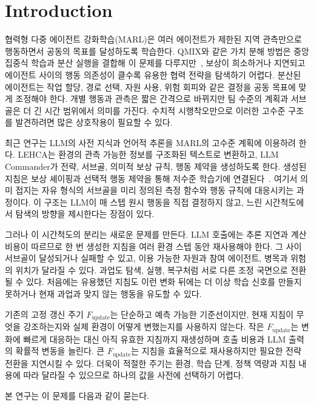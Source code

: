 \section{Introduction}

협력형 다중 에이전트 강화학습(MARL)은 여러 에이전트가 제한된 지역 관측만으로
행동하면서 공동의 목표를 달성하도록 학습한다. QMIX와 같은 가치 분해 방법은
중앙집중식 학습과 분산 실행을 결합해 이 문제를 다루지만~\cite{rashid2018qmix},
보상이 희소하거나 지연되고 에이전트 사이의 행동 의존성이 클수록 유용한 협력 전략을
탐색하기 어렵다. 분산된 에이전트는 작업 할당, 경로 선택, 자원 사용, 위험 회피와
같은 결정을 공동 목표에 맞게 조정해야 한다. 개별 행동과 관측은 짧은 간격으로
바뀌지만 팀 수준의 계획과 서브골은 더 긴 시간 범위에서 의미를 가진다. 수치적
시행착오만으로 이러한 고수준 구조를 발견하려면 많은 상호작용이 필요할 수 있다.

최근 연구는 LLM의 사전 지식과 언어적 추론을 MARL의 고수준 계획에 이용하려 한다.
LEHCA는 환경의 관측 가능한 정보를 구조화된 텍스트로 변환하고, LLM Commander가
전략, 서브골, 의미적 보상 규칙, 행동 제약을 생성하도록 한다. 생성된 지침은 보상
셰이핑과 선택적 행동 제약을 통해 저수준 학습기에 연결된다~\cite{bai2026lehca}.
여기서 의미 접지는 자유 형식의 서브골을 미리 정의된 측정 함수와 행동 규칙에
대응시키는 과정이다. 이 구조는 LLM이 매 스텝 원시 행동을 직접 결정하지 않고,
느린 시간척도에서 탐색의 방향을 제시한다는 장점이 있다.

그러나 이 시간척도의 분리는 새로운 문제를 만든다. LLM 호출에는 추론 지연과 계산
비용이 따르므로 한 번 생성한 지침을 여러 환경 스텝 동안 재사용해야 한다. 그 사이
서브골이 달성되거나 실패할 수 있고, 이용 가능한 자원과 참여 에이전트, 병목과 위험의
위치가 달라질 수 있다. 과업도 탐색, 실행, 복구처럼 서로 다른 조정 국면으로 전환될
수 있다. 처음에는 유용했던 지침도 이런 변화 뒤에는 더 이상 학습 신호를 만들지
못하거나 현재 과업과 맞지 않는 행동을 유도할 수 있다.

기존의 고정 갱신 주기 $F_{\mathrm{update}}$는 단순하고 예측 가능한 기준선이지만,
현재 지침이 무엇을 강조하는지와 실제 환경이 어떻게 변했는지를 사용하지 않는다.
작은 $F_{\mathrm{update}}$는 변화에 빠르게 대응하는 대신 아직 유효한 지침까지
재생성하며 호출 비용과 LLM 출력의 확률적 변동을 늘린다. 큰
$F_{\mathrm{update}}$는 지침을 효율적으로 재사용하지만 필요한 전략 전환을 지연시킬
수 있다. 더욱이 적절한 주기는 환경, 학습 단계, 정책 역량과 지침 내용에 따라 달라질
수 있으므로 하나의 값을 사전에 선택하기 어렵다.

본 연구는 이 문제를 다음과 같이 묻는다.

